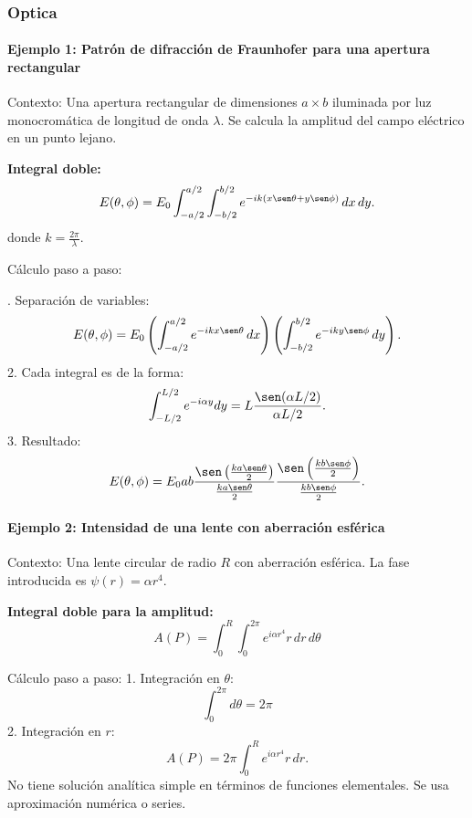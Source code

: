 \documentclass[11pt]{book}
\theoremstyle{definicion}
\theoremstyle{teorema}
\theoremstyle{ejemplo}
\begin{document}
\subsubsection{Optica} 

\paragraph{Ejemplo 1: Patrón de difracción de Fraunhofer para una apertura rectangular}
Contexto: Una apertura rectangular de dimensiones \( a \times b \) iluminada por luz monocromática de longitud de onda \( \lambda \). Se calcula la amplitud del campo eléctrico en un punto lejano.

\medskip

\noindent \textbf{Integral doble:}
\[
E(\theta, \phi) = E_0 \int_{-a/2}^{a/2} \int_{-b/2}^{b/2} e^{-i k (x \sen\theta + y \sen\phi)} \, dx \, dy.
\]
donde \( k = \frac{2\pi}{\lambda} \).

\medskip

\noindent Cálculo paso a paso:

. Separación de variables:
   \[
   E(\theta, \phi) = E_0 \left( \int_{-a/2}^{a/2} e^{-i k x \sen\theta} \, dx \right) \left( \int_{-b/2}^{b/2} e^{-i k y \sen\phi} \, dy \right).
   \]
2. Cada integral es de la forma:
   \[
   \int_{-L/2}^{L/2} e^{-i \alpha y} dy = L \frac{\sen(\alpha L/2)}{\alpha L/2}.
   \]
3. Resultado:
   \[
   \displaystyle
   E(\theta, \phi) = E_0 a b \frac{\sen\left(\frac{k a \sen\theta}{2}\right)}{\frac{k a \sen\theta}{2}} \frac{\sen\left(\frac{k b \sen\phi}{2}\right)}{\frac{k b \sen\phi}{2}}.
   \]

\paragraph{Ejemplo 2: Intensidad de una lente con aberración esférica}
Contexto: Una lente circular de radio \( R \) con aberración esférica. La fase introducida es \( \psi(r) = \alpha r^4 \).

\medskip

\noindent
\textbf{Integral doble para la amplitud:}
\[
A(P) = \int_{0}^{R} \int_{0}^{2\pi} e^{i \alpha r^4} r \, dr \, d\theta
\]

\medskip

\noindent
Cálculo paso a paso:
1. Integración en \( \theta \):
   \[
   \int_{0}^{2\pi} d\theta = 2\pi
   \]
2. Integración en \( r \):
   \[
   A(P) = 2\pi \int_{0}^{R} e^{i \alpha r^4} r \, dr.
   \]
   No tiene solución analítica simple en términos de funciones elementales. %
   Se usa aproximación numérica o series.
\end{document}
